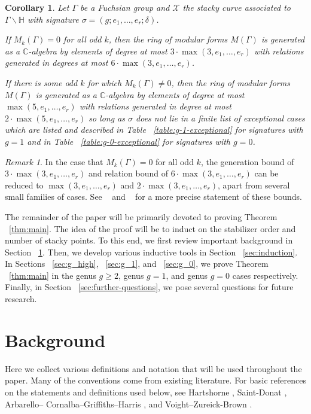 \documentclass{amsart}
\theoremstyle{plain}
\newtheorem{cor}[thm]{Corollary}
\theoremstyle{definition}
\theoremstyle{remark}
\newtheorem{rem}[thm]{Remark}
\numberwithin{equation}{section}
\newcommand\BH{{\mathbb H}}
\newcommand\BC{{\mathbb C}}
\newcommand\sx{\mathscr X}
\begin{document}
\begin{cor}
\label{cor:main-mod-forms}
Let $\Gamma$ be a Fuchsian group and $\sx$ the stacky curve
associated to $\Gamma \backslash \BH$ with signature $\sigma
= (g; e_1, \ldots, e_r; \delta)$. 

If $M_k(\Gamma) = 0$ for all odd $k$, then the ring of modular
forms $M(\Gamma)$ is generated as a $\BC$-algebra by elements of
degree at most $3 \cdot \max(3, e_1, \ldots, e_r)$ with relations
generated in degrees at most $6 \cdot \max(3, e_1,\ldots, e_r)$.

If there is some odd $k$ for which $M_k(\Gamma) \neq 0$, then the
ring of modular forms $M(\Gamma)$ is generated as a $\BC$-algebra
by elements of degree at most $\max(5, e_1, \ldots, e_r)$ with
relations generated in degree at most $2 \cdot \max(5, e_1, \ldots, 
e_r)$ so long as $\sigma$ does not lie in a finite list of
exceptional cases which are listed and described in Table
~\ref{table:g-1-exceptional} for signatures with $g = 1$ and in
Table ~\ref{table:g-0-exceptional} for signatures with $g = 0$.
\end{cor}

\begin{rem}
In the case that $M_k(\Gamma) = 0$ for all odd $k$, the generation bound of $3 \cdot \max(3, e_1, \ldots, e_r)$ and relation
bound of $6 \cdot \max(3, e_1,\ldots, e_r)$ can be reduced to $\max(3,e_1, \ldots, e_r)$ and $2 \cdot \max(3,e_1, \ldots, e_r)$, apart from several small families of cases. See 
~\cite[Theorem 9.3.1]{vzb:stacky} and ~\cite[Theorem 9.3.1]{vzb:stacky} for a more precise statement of these bounds.
\end{rem}

The remainder of the paper will be primarily devoted to proving
Theorem ~\ref{thm:main}. The idea of the
proof will be to induct on the stabilizer order and number of stacky points. To this end, we first review important background in
Section ~\ref{sec:background}. Then, we develop various inductive
tools in Section ~\ref{sec:induction}. In Sections ~\ref{sec:g_high},
~\ref{sec:g_1}, and ~\ref{sec:g_0}, we prove Theorem
~\ref{thm:main} in the genus $ g \geq 2$, genus
$g = 1$, and genus $g = 0$ cases respectively. Finally, in Section
~\ref{sec:further-questions}, we pose several questions for future
research.


\section{Background}
\label{sec:background}
Here we collect various definitions and notation that will be
used throughout the paper. Many of the conventions come from existing
literature. For basic references on the statements and definitions
used below, see Hartshorne \cite[Chapter IV]{hartshorne:ag},
Saint-Donat \cite{saint-donat:proj}, Arbarello--
Cornalba--Griffiths--Harris \cite[Section III.2]
{acgh:algebraic-curves}, and Voight--Zureick-Brown \cite[Chapter 2,
Chapter 5]{vzb:stacky}.
\end{document}
